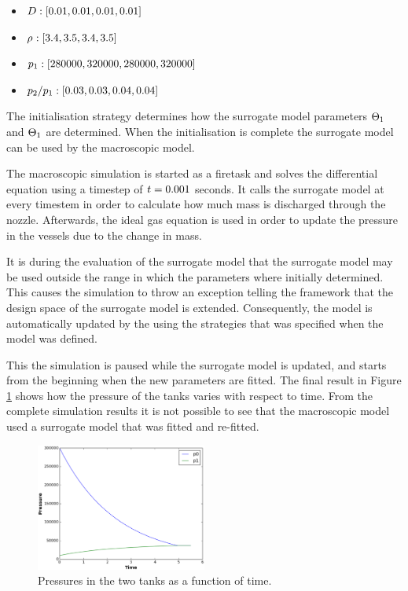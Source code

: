 \begin{itemize}
	\item $D: [0.01, 0.01, 0.01, 0.01]$
	\item $\rho_{}: [3.4, 3.5, 3.4, 3.5]$
	\item $p_1: [280000, 320000, 280000, 320000]$
	\item $p_2/p_1: [0.03, 0.03, 0.04, 0.04]$
\end{itemize}
%
The initialisation strategy determines how the surrogate model parameters $\Theta_1$ and $\Theta_1$ are determined.
When the initialisation is complete the surrogate model can be used by the macroscopic model. 
%
\par
%
\newcommand{\sunshine}{\ensuremath{\Time = 0.001}}
The macroscopic simulation is started as a firetask and solves the differential equation using a timestep of {\sunshine} seconds.
It calls the surrogate model at every timestem in order to calculate how much mass is discharged through the nozzle.
Afterwards, the ideal gas equation is used in order to update the pressure in the vessels due to the change in mass.
%
\par
%
It is during the evaluation of the surrogate model that the surrogate model may be used outside the range in which the parameters where initially determined. 
This causes the simulation to throw an exception telling the framework that the design space of the surrogate model is extended.
Consequently, the model is automatically updated by the {\MoDeNa} using the strategies that was specified when the model was defined. 
%
\par
%
This the simulation is paused while the surrogate model is updated, and starts from the beginning when the new parameters are fitted. 
The final result in Figure \ref{fig:twoTanks:Pressure} shows how the pressure of the tanks varies with respect to time.
From the complete simulation results it is not possible to see that the macroscopic model used a surrogate model that was fitted and re-fitted.
%
\begin{figure}
  \centering
  \includegraphics[width=0.5\textwidth,keepaspectratio=true]{./Content/Figures/pressureplot.eps}
  \caption{Pressures in the two tanks as a function of time.}
  \label{fig:twoTanks:Pressure}
\end{figure}

